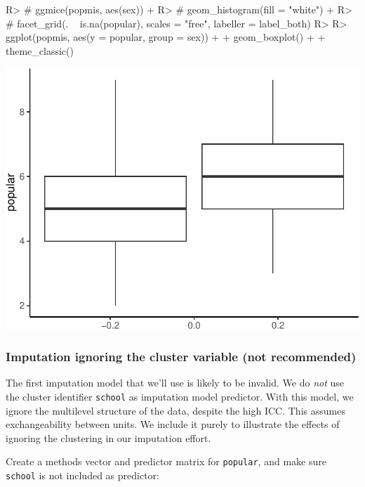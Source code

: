 \documentclass[
]{jss}
\begin{document}
\begin{CodeChunk}
\begin{CodeInput}
R> # ggmice(popmis, aes(sex)) +
R> #   geom_histogram(fill = "white") +
R> #   facet_grid(. ~ is.na(popular), scales = "free", labeller = label_both)
R> 
R> ggplot(popmis, aes(y = popular, group = sex)) +
+   geom_boxplot() + 
+   theme_classic()
\end{CodeInput}


\begin{center}\includegraphics{Imputation_of_Incomplete_Multilevel_Data_files/figure-latex/pop-hist-1} \end{center}

\end{CodeChunk}

\hypertarget{imputation-ignoring-the-cluster-variable-not-recommended}{%
\subsubsection{Imputation ignoring the cluster variable (not
recommended)}\label{imputation-ignoring-the-cluster-variable-not-recommended}}

The first imputation model that we'll use is likely to be invalid. We do
\emph{not} use the cluster identifier \texttt{school} as imputation
model predictor. With this model, we ignore the multilevel structure of
the data, despite the high ICC. This assumes exchangeability between
units. We include it purely to illustrate the effects of ignoring the
clustering in our imputation effort.

Create a methods vector and predictor matrix for \texttt{popular}, and
make sure \texttt{school} is not included as predictor:
\end{document}

